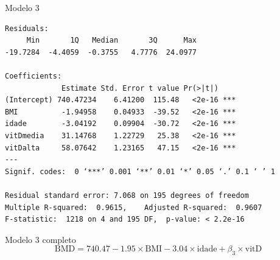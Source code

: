 \documentclass{beamer}
\begin{document}
\begin{frame}[fragile]{\scriptsize }
  \begin{center}
    \begin{exampleblock}{Modelo 3}
      \tiny
\begin{verbatim}
Residuals:
     Min       1Q   Median       3Q      Max 
-19.7284  -4.4059  -0.3755   4.7776  24.0977 

Coefficients:
             Estimate Std. Error t value Pr(>|t|)    
(Intercept) 740.47234    6.41200  115.48   <2e-16 ***
BMI          -1.94958    0.04933  -39.52   <2e-16 ***
idade        -3.04192    0.09904  -30.72   <2e-16 ***
vitDmedia    31.14768    1.22729   25.38   <2e-16 ***
vitDalta     58.07642    1.23165   47.15   <2e-16 ***
---
Signif. codes:  0 ‘***’ 0.001 ‘**’ 0.01 ‘*’ 0.05 ‘.’ 0.1 ‘ ’ 1

Residual standard error: 7.068 on 195 degrees of freedom
Multiple R-squared:  0.9615,	Adjusted R-squared:  0.9607 
F-statistic:  1218 on 4 and 195 DF,  p-value: < 2.2e-16
\end{verbatim}
    \end{exampleblock}
  \begin{exampleblock}{Modelo 3 completo}
    \footnotesize
    \begin{displaymath}
      \text{BMD} =740.47 -1.95 \times\text{BMI} -3.04 \times\text{idade} + \beta_3 \times\text{vitD}
    \end{displaymath}
  \end{exampleblock}
  \end{center}
\end{frame}
\end{document}
